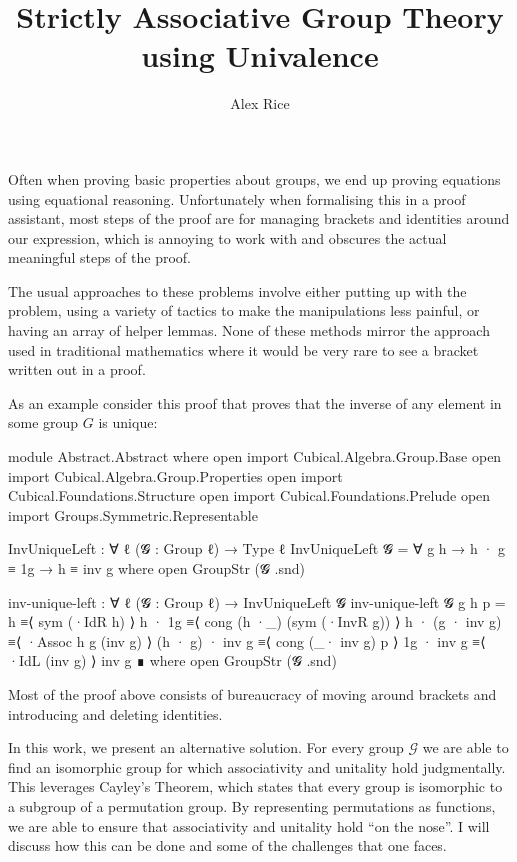\documentclass{article}
\title{Strictly Associative Group Theory using Univalence}
\author{Alex Rice}
\begin{document}
\maketitle

Often when proving basic properties about groups, we end up proving equations using equational reasoning. Unfortunately when formalising this in a proof assistant, most steps of the proof are for managing brackets and identities around our expression, which is annoying to work with and obscures the actual meaningful steps of the proof.

The usual approaches to these problems involve either putting up with the problem, using a variety of tactics to make the manipulations less painful, or having an array of helper lemmas. None of these methods mirror the approach used in traditional mathematics where it would be very rare to see a bracket written out in a proof.

As an example consider this proof that proves that the inverse of any element in some group \(G\) is unique:

\begin{code}[hide]
module Abstract.Abstract where
open import Cubical.Algebra.Group.Base
open import Cubical.Algebra.Group.Properties
open import Cubical.Foundations.Structure
open import Cubical.Foundations.Prelude
open import Groups.Symmetric.Representable
\end{code}

\begin{code}
InvUniqueLeft : ∀ {ℓ} (𝓖 : Group ℓ) → Type ℓ
InvUniqueLeft 𝓖 = ∀ g h → h · g ≡ 1g → h ≡ inv g
  where
    open GroupStr (𝓖 .snd)

inv-unique-left : ∀ {ℓ} (𝓖 : Group ℓ) → InvUniqueLeft 𝓖
inv-unique-left 𝓖 g h p =
  h                ≡⟨ sym (·IdR h) ⟩
  h · 1g           ≡⟨ cong (h ·_) (sym (·InvR g)) ⟩
  h · (g · inv g)  ≡⟨ ·Assoc h g (inv g) ⟩
  (h · g) · inv g  ≡⟨ cong (_· inv g) p ⟩
  1g · inv g       ≡⟨ ·IdL (inv g) ⟩
  inv g ∎
  where
    open GroupStr (𝓖 .snd)
\end{code}

Most of the proof above consists of bureaucracy of moving around brackets and introducing and deleting identities.

In this work, we present an alternative solution. For every group \(\mathcal{G}\) we are able to find an isomorphic group for which associativity and unitality hold judgmentally. This leverages Cayley's Theorem, which states that every group is isomorphic to a subgroup of a permutation group. By representing permutations as functions, we are able to ensure that associativity and unitality hold ``on the nose''. I will discuss how this can be done and some of the challenges that one faces.
\end{document}
